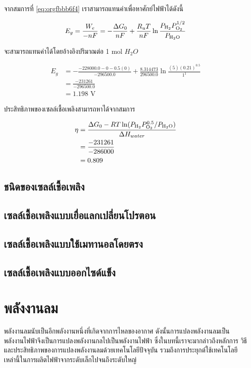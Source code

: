 \documentclass[a4paper,nobib,openany,10pt]{tufte-book}
\begin{document}
จากสมการที่ \ref{eq:orgfbbb6f4}
เราสามารถแทนค่าเพื่อหาศักย์ไฟฟ้าได้ดังนี้

\[E_g = \frac{W_e}{-nF} = -\frac{\Delta G_0}{nF} + \frac{R_u T}{nF} \ln \frac{P_{\ce{H2}} P_{\ce{O2}}^{1/2}}{P_{\ce{H2O}}}\]

จะสามารถแทนค่าได้โดยอ้างอิงปริมาณต่อ 1 mol \(H_2O\)

\begin{align*}
E_g &= - \frac{-228000.0-0- 0.5(0)}{-296500.0} + \frac{8.314473}{296500.0} \ln \frac{(5)(0.21)^{0.5}}{1^1} \\
&= \frac{-231261}{-296500.0} \\
&= 1.198\text{ V}
\end{align*}

ประสิทธิภาพของเซลล์เชื้อเพลิงสามารถหาได้จากสมการ

\begin{align*}
\eta &= \frac{\Delta G_0 - RT \ln (P_{\ce{H_2}} P_{\ce{O2}}^{0.5}/ P_{\ce{H2O}})}{\Delta H_{water}} \\
&= \frac{-231261}{-286000} \\ 
&=0.809\\
\end{align*}

\section{ชนิดของเซลล์เชื้อเพลิง}
\label{sec:org25f852b}
\section{เซลล์เชื้อเพลิงแบบเยื่อแลกเปลี่ยนโปรตอน}
\label{sec:orgdcd6b3e}
\section{เซลล์เชื้อเพลิงแบบใช้เมทานอลโดยตรง}
\label{sec:org524584a}
\section{เซลล์เชื้อเพลิงแบบออกไซด์แข็ง}
\label{sec:org60249f3}
\chapter{พลังงานลม}
\label{sec:org213db6d}
พลังงานลมนับเป็นอีกพลังงานหนึ่งที่เกิดจากการไหลของอากาศ
ดังนั้นการแปลงพลังงานลมเป็นพลังงานไฟฟ้าจึงเป็นการแปลงพลังงานกลไปเป็นพลังงานไฟฟ้า
ซึ่งในบทนี้เราจะมากล่าวถึงหลักการ วิธี
และประสิทธิภาพของการแปลงพลังงานลมด้วยเทคโนโลยีปัจจุบัน
รวมถึงการประยุกต์ใช้เทคโนโลยีเหล่านี้ในการผลิตไฟฟ้าจากระดับเล็กไปจนถึงระดับใหญ่
\end{document}
